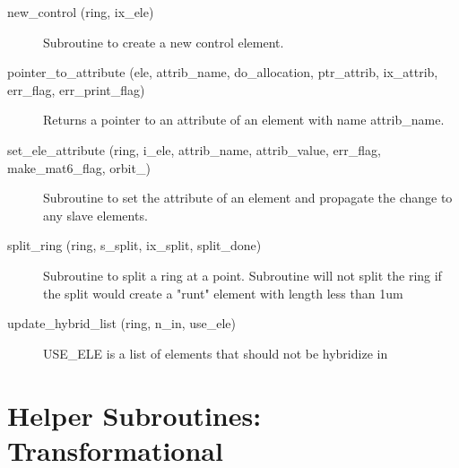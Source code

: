 \begin{description}
\item[new\_control (ring, ix\_ele)] \Newline
Subroutine to create a new control element. 

\item[pointer\_to\_attribute (ele, attrib\_name, do\_allocation, ptr\_attrib, ix\_attrib, err\_flag, err\_print\_flag)] \Newline
Returns a pointer to an attribute of an element with name attrib\_name. 

\item[set\_ele\_attribute (ring, i\_ele, attrib\_name, attrib\_value, err\_flag, make\_mat6\_flag, orbit\_)] \Newline
Subroutine to set the attribute of an element and propagate the change to any slave elements. 

\item[split\_ring (ring, s\_split, ix\_split, split\_done)] \Newline
Subroutine to split a ring at a point. Subroutine will not split the ring if the split would create a "runt" element with length less than 1um 

\item[update\_hybrid\_list (ring, n\_in, use\_ele)] \Newline
USE\_ELE is a list of elements that should not be hybridize in 

\end{description}

\section{Helper Subroutines: Transformational}
\label{r:trans}    

